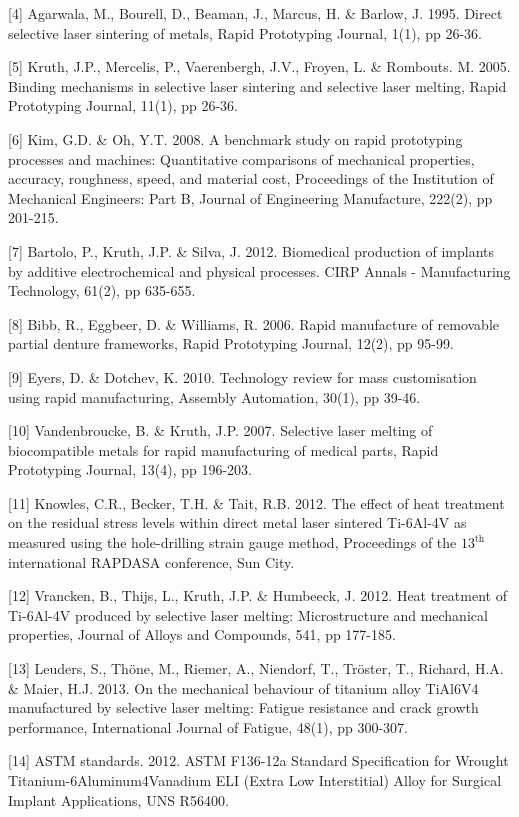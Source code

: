 \documentclass[10pt]{article}
\begin{document}
[4] Agarwala, M., Bourell, D., Beaman, J., Marcus, H. \& Barlow, J. 1995. Direct selective laser sintering of metals, Rapid Prototyping Journal, 1(1), pp 26-36.

[5] Kruth, J.P., Mercelis, P., Vaerenbergh, J.V., Froyen, L. \& Rombouts. M. 2005. Binding mechanisms in selective laser sintering and selective laser melting, Rapid Prototyping Journal, 11(1), pp 26-36.

[6] Kim, G.D. \& Oh, Y.T. 2008. A benchmark study on rapid prototyping processes and machines: Quantitative comparisons of mechanical properties, accuracy, roughness, speed, and material cost, Proceedings of the Institution of Mechanical Engineers: Part B, Journal of Engineering Manufacture, 222(2), pp 201-215.

[7] Bartolo, P., Kruth, J.P. \& Silva, J. 2012. Biomedical production of implants by additive electrochemical and physical processes. CIRP Annals - Manufacturing Technology, 61(2), pp 635-655.

[8] Bibb, R., Eggbeer, D. \& Williams, R. 2006. Rapid manufacture of removable partial denture frameworks, Rapid Prototyping Journal, 12(2), pp 95-99.

[9] Eyers, D. \& Dotchev, K. 2010. Technology review for mass customisation using rapid manufacturing, Assembly Automation, 30(1), pp 39-46.

[10] Vandenbroucke, B. \& Kruth, J.P. 2007. Selective laser melting of biocompatible metals for rapid manufacturing of medical parts, Rapid Prototyping Journal, 13(4), pp 196-203.

[11] Knowles, C.R., Becker, T.H. \& Tait, R.B. 2012. The effect of heat treatment on the residual stress levels within direct metal laser sintered Ti-6Al-4V as measured using the hole-drilling strain gauge method, Proceedings of the $13^{\text {th }}$ international RAPDASA conference, Sun City.

[12] Vrancken, B., Thijs, L., Kruth, J.P. \& Humbeeck, J. 2012. Heat treatment of Ti-6Al-4V produced by selective laser melting: Microstructure and mechanical properties, Journal of Alloys and Compounds, 541, pp 177-185.

[13] Leuders, S., Thöne, M., Riemer, A., Niendorf, T., Tröster, T., Richard, H.A. \& Maier, H.J. 2013. On the mechanical behaviour of titanium alloy TiAl6V4 manufactured by selective laser melting: Fatigue resistance and crack growth performance, International Journal of Fatigue, 48(1), pp 300-307.

[14] ASTM standards. 2012. ASTM F136-12a Standard Specification for Wrought Titanium-6Aluminum4Vanadium ELI (Extra Low Interstitial) Alloy for Surgical Implant Applications, UNS R56400.
\end{document}
